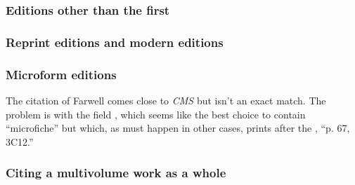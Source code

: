 \documentclass[11pt,letterpaper,oneside]{article}
\begin{document}
\subsubsection{Editions other than the first}

\begin{citebib}
\item \cite[401--2]{einsohn2011}
\item \cite[101]{boudett2013}
\item \cite{strunk2000}
\end{citebib}

\subsubsection{Reprint editions and modern editions}


\begin{citebib}
\item \cite[152--53]{barzun1994}
\item \cite{bahadur2014}
\item \cite{emerson1985}
\item \cite{schweitzer1966}
\end{citebib}

\subsubsection{Microform editions}

The citation of Farwell comes close to \textit{CMS} but isn't an exact
match. The problem is with the field , which
seems like the best choice to contain ``microfiche'' but which, as
must happen in other cases, prints after the , ``p.
67, 3C12.''

\begin{citebib}
\item \cite[p. 67, 3C12]{farwell1997}
\item \cite{tauber1958}
\end{citebib}

\setcounter{subsubsection}{116}
\subsubsection{Citing a multivolume work as a whole}
\end{document}
